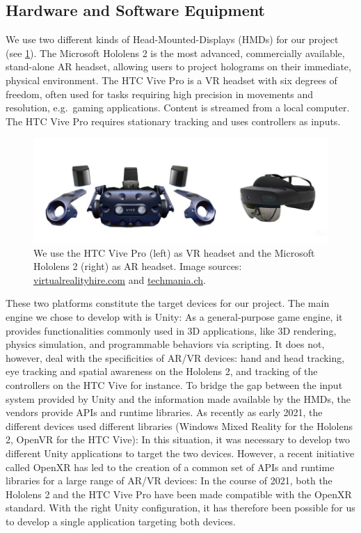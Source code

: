 \documentclass[10pt,twocolumn,letterpaper,english]{article}
\begin{document}
\subsection{Hardware and Software Equipment}

We use two different kinds of Head-Mounted-Displays (HMDs) for our project (see \cref{fig:hmd}). The Microsoft Hololens 2 is the most advanced, commercially available, stand-alone AR headset, allowing users to project holograms on their immediate, physical environment. The HTC Vive Pro is a VR headset with six degrees of freedom, often used for tasks requiring high precision in movements and resolution, e.g.\ gaming applications. Content is streamed from a local computer. The HTC Vive Pro requires stationary tracking and uses controllers as inputs.

\begin{figure}[!htp]
    \centering
    \includegraphics[width=1\linewidth]{headsets.png}
    \caption{We use the HTC Vive Pro (left) as VR headset and the Microsoft Hololens 2 (right) as AR headset. Image sources: \url{virtualrealityhire.com} and \url{techmania.ch}.}
    \label{fig:hmd}
\end{figure}

These two platforms constitute the target devices for our project. The main engine we chose to develop with is Unity: As a general-purpose game engine, it provides functionalities commonly used in 3D applications, like 3D rendering, physics simulation, and programmable behaviors via scripting. It does not, however, deal with the specificities of AR/VR devices: hand and head tracking, eye tracking and spatial awareness on the Hololens 2, and tracking of the controllers on the HTC Vive for instance. To bridge the gap between the input system provided by Unity and the information made available by the HMDs, the vendors provide APIs and runtime libraries. As recently as early 2021, the different devices used different libraries (Windows Mixed Reality for the Hololens 2, OpenVR for the HTC Vive): In this situation, it was necessary to develop two different Unity applications to target the two devices. However, a recent initiative called OpenXR has led to the creation of a common set of APIs and runtime libraries for a large range of AR/VR devices: In the course of 2021, both the Hololens 2 and the HTC Vive Pro have been made compatible with the OpenXR standard. With the right Unity configuration, it has therefore been possible for us to develop a single application targeting both devices.
\end{document}
